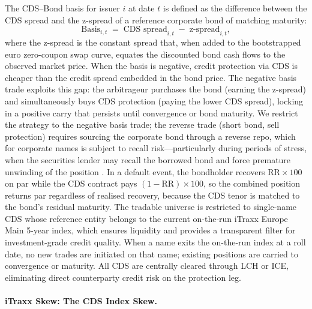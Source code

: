 The CDS--Bond basis for issuer $i$ at date $t$ is defined as the
difference between the CDS spread and the z-spread of a reference
corporate bond of matching maturity:
\begin{equation}
\text{Basis}_{i,t} \;=\; \text{CDS spread}_{i,t} \;-\;
\text{z-spread}_{i,t},
\label{eq:basis_cds}
\end{equation}
where the z-spread is the constant spread that, when added to the
bootstrapped euro zero-coupon swap curve, equates the discounted bond
cash flows to the observed market price. When the basis is negative,
credit protection via CDS is cheaper than the credit spread embedded
in the bond price. The negative basis trade exploits this gap: the
arbitrageur purchases the bond (earning the z-spread) and
simultaneously buys CDS protection (paying the lower CDS spread),
locking in a positive carry that persists until convergence or bond
maturity. We restrict the strategy to the negative basis trade; the
reverse trade (short bond, sell protection) requires sourcing the
corporate bond through a reverse repo, which for corporate names is
subject to recall risk---particularly during periods of stress, when
the securities lender may recall the borrowed bond and force premature
unwinding of the position \citep{bai2019cds}. In a default event, the
bondholder recovers $\text{RR} \times 100$ on par while the CDS
contract pays $(1 - \text{RR}) \times 100$, so the combined position
returns par regardless of realised recovery, because the CDS tenor is
matched to the bond's residual maturity. The tradable universe is
restricted to single-name CDS whose reference entity belongs to the
current on-the-run iTraxx Europe Main 5-year index, which ensures
liquidity and provides a transparent filter for investment-grade
credit quality. When a name exits the on-the-run index at a roll date,
no new trades are initiated on that name; existing positions are
carried to convergence or maturity. All CDS are centrally cleared
through LCH or ICE, eliminating direct counterparty credit risk on the
protection leg.



\paragraph{iTraxx Skew: The CDS Index Skew.}


